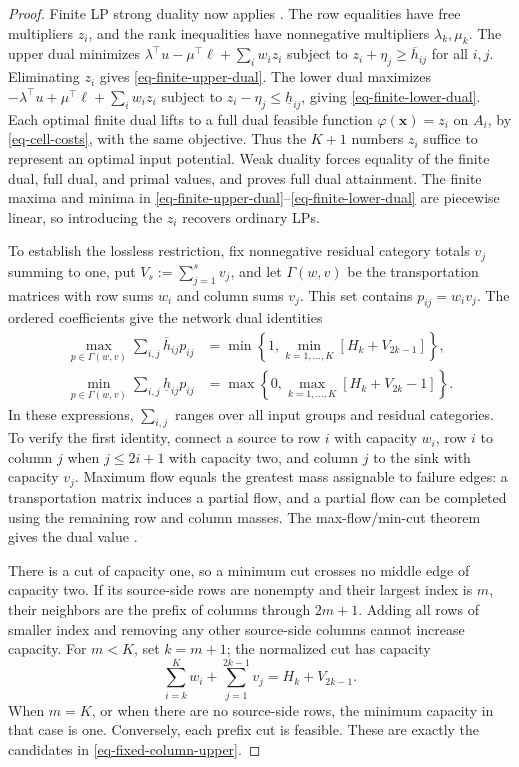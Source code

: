 \begin{proof}
  Finite LP strong duality now applies \citep[Section~5.2.3]{B.V04}. The row equalities have free multipliers $z_i$, and the rank inequalities have nonnegative multipliers $\lambda_k,\mu_k$. The upper dual minimizes $\lambda^\top u-\mu^\top\ell+\sum_iw_iz_i$ subject to $z_i+\eta_j\ge\overline h_{ij}$ for all $i,j$. Eliminating $z_i$ gives \eqref{eq-finite-upper-dual}. The lower dual maximizes $-\lambda^\top u+\mu^\top\ell+\sum_iw_iz_i$ subject to $z_i-\eta_j\le\underline h_{ij}$, giving \eqref{eq-finite-lower-dual}. Each optimal finite dual lifts to a full dual feasible function $\varphi(\bm x)=z_i$ on $A_i$, by \eqref{eq-cell-costs}, with the same objective. Thus the $K+1$ numbers $z_i$ suffice to represent an optimal input potential. Weak duality forces equality of the finite dual, full dual, and primal values, and proves full dual attainment. The finite maxima and minima in \eqref{eq-finite-upper-dual}--\eqref{eq-finite-lower-dual} are piecewise linear, so introducing the $z_i$ recovers ordinary LPs.

  To establish the lossless restriction, fix nonnegative residual category totals $v_j$ summing to one, put $V_s:=\sum_{j=1}^s v_j$, and let $\Gamma(w,v)$ be the transportation matrices with row sums $w_i$ and column sums $v_j$. This set contains $p_{ij}=w_iv_j$. The ordered coefficients give the network dual identities
  \begin{align}
    \max_{p\in\Gamma(w,v)}\sum_{i,j}\overline h_{ij}p_{ij}
    &=\min\left\{1,\min_{k=1,\ldots,K}\left[H_k+V_{2k-1}\right]\right\},
    \label{eq-fixed-column-upper}\\
    \min_{p\in\Gamma(w,v)}\sum_{i,j}\underline h_{ij}p_{ij}
    &=\max\left\{0,\max_{k=1,\ldots,K}\left[H_k+V_{2k}-1\right]\right\}.
    \label{eq-fixed-column-lower}
  \end{align}
  In these expressions, $\sum_{i,j}$ ranges over all input groups and residual categories. To verify the first identity, connect a source to row $i$ with capacity $w_i$, row $i$ to column $j$ when $j\le2i+1$ with capacity two, and column $j$ to the sink with capacity $v_j$. Maximum flow equals the greatest mass assignable to failure edges: a transportation matrix induces a partial flow, and a partial flow can be completed using the remaining row and column masses. The max-flow/min-cut theorem gives the dual value \citep{F.F56}.

  There is a cut of capacity one, so a minimum cut crosses no middle edge of capacity two. If its source-side rows are nonempty and their largest index is $m$, their neighbors are the prefix of columns through $2m+1$. Adding all rows of smaller index and removing any other source-side columns cannot increase capacity. For $m<K$, set $k=m+1$; the normalized cut has capacity
  \[
    \sum_{i=k}^K w_i+\sum_{j=1}^{2k-1}v_j=H_k+V_{2k-1}.
  \]
  When $m=K$, or when there are no source-side rows, the minimum capacity in that case is one. Conversely, each prefix cut is feasible. These are exactly the candidates in \eqref{eq-fixed-column-upper}.


\end{proof}
